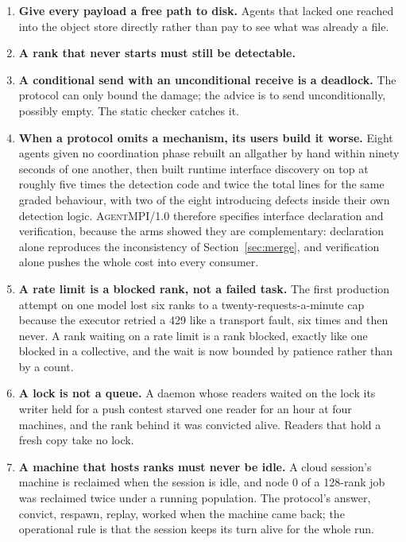 \documentclass[sigconf,nonacm]{acmart}
\newcommand{\ampi}{\textsc{AgentMPI}\xspace}
\begin{document}
\begin{enumerate}
\item \textbf{Give every payload a free path to disk.} Agents that lacked one
reached into the object store directly rather than pay to see what was already a
file.

\item \textbf{A rank that never starts must still be detectable.}

\item \textbf{A conditional send with an unconditional receive is a deadlock.}
The protocol can only bound the damage; the advice is to send unconditionally,
possibly empty. The static checker catches it.

\item \textbf{When a protocol omits a mechanism, its users build it worse.} Eight
agents given no coordination phase rebuilt an allgather by hand within ninety
seconds of one another, then built runtime interface discovery on top at roughly
five times the detection code and twice the total lines for the same graded
behaviour, with two of the eight introducing defects inside their own detection
logic. \ampi/1.0 therefore specifies interface declaration and verification,
because the arms showed they are complementary: declaration alone reproduces the
inconsistency of Section~\ref{sec:merge}, and verification alone pushes the
whole cost into every consumer.

\item \textbf{A rate limit is a blocked rank, not a failed task.} The first
production attempt on one model lost six ranks to a twenty-requests-a-minute cap
because the executor retried a 429 like a transport fault, six times and then
never. A rank waiting on a rate limit is a rank blocked, exactly like one blocked
in a collective, and the wait is now bounded by patience rather than by a count.

\item \textbf{A lock is not a queue.} A daemon whose readers waited on the lock
its writer held for a push contest starved one reader for an hour at four
machines, and the rank behind it was convicted alive. Readers that hold a fresh
copy take no lock.

\item \textbf{A machine that hosts ranks must never be idle.} A cloud session's
machine is reclaimed when the session is idle, and node 0 of a 128-rank job was
reclaimed twice under a running population. The protocol's answer, convict,
respawn, replay, worked when the machine came back; the operational rule is that
the session keeps its turn alive for the whole run.


\end{enumerate}
\end{document}
